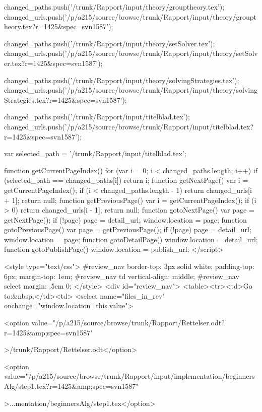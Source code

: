  
 changed_paths.push('/trunk/Rapport/input/theory/grouptheory.tex');
 changed_urls.push('/p/a215/source/browse/trunk/Rapport/input/theory/grouptheory.tex?r=1425&spec=svn1587');
 
 
 changed_paths.push('/trunk/Rapport/input/theory/setSolver.tex');
 changed_urls.push('/p/a215/source/browse/trunk/Rapport/input/theory/setSolver.tex?r=1425&spec=svn1587');
 
 
 changed_paths.push('/trunk/Rapport/input/theory/solvingStrategies.tex');
 changed_urls.push('/p/a215/source/browse/trunk/Rapport/input/theory/solvingStrategies.tex?r=1425&spec=svn1587');
 
 
 changed_paths.push('/trunk/Rapport/input/titelblad.tex');
 changed_urls.push('/p/a215/source/browse/trunk/Rapport/input/titelblad.tex?r=1425&spec=svn1587');
 
 var selected_path = '/trunk/Rapport/input/titelblad.tex';
 
 
 function getCurrentPageIndex() {
 for (var i = 0; i < changed_paths.length; i++) {
 if (selected_path == changed_paths[i]) {
 return i;
 }
 }
 }
 function getNextPage() {
 var i = getCurrentPageIndex();
 if (i < changed_paths.length - 1) {
 return changed_urls[i + 1];
 }
 return null;
 }
 function getPreviousPage() {
 var i = getCurrentPageIndex();
 if (i > 0) {
 return changed_urls[i - 1];
 }
 return null;
 }
 function gotoNextPage() {
 var page = getNextPage();
 if (!page) {
 page = detail_url;
 }
 window.location = page;
 }
 function gotoPreviousPage() {
 var page = getPreviousPage();
 if (!page) {
 page = detail_url;
 }
 window.location = page;
 }
 function gotoDetailPage() {
 window.location = detail_url;
 }
 function gotoPublishPage() {
 window.location = publish_url;
 }
</script>
 
 <style type="text/css">
 #review_nav {
 border-top: 3px solid white;
 padding-top: 6px;
 margin-top: 1em;
 }
 #review_nav td {
 vertical-align: middle;
 }
 #review_nav select {
 margin: .5em 0;
 }
 </style>
 <div id="review_nav">
 <table><tr><td>Go to:&nbsp;</td><td>
 <select name="files_in_rev" onchange="window.location=this.value">
 
 <option value="/p/a215/source/browse/trunk/Rapport/Rettelser.odt?r=1425&amp;spec=svn1587"
 
 >/trunk/Rapport/Rettelser.odt</option>
 
 <option value="/p/a215/source/browse/trunk/Rapport/input/implementation/beginnersAlg/step1.tex?r=1425&amp;spec=svn1587"
 
 >...mentation/beginnersAlg/step1.tex</option>
 
